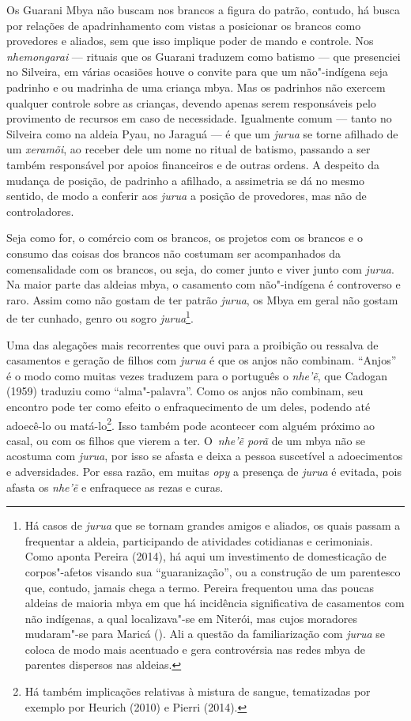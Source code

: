 Os Guarani Mbya não buscam nos brancos a figura do patrão, contudo, há
busca por relações de apadrinhamento com vistas a posicionar os brancos
como provedores e aliados, sem que isso implique poder de mando e
controle. Nos \emph{nhemongarai} --- rituais que os Guarani traduzem como
batismo --- que presenciei no Silveira, em várias ocasiões houve o
convite para que um não"-indígena seja padrinho e ou madrinha de uma
criança mbya. Mas os padrinhos não exercem qualquer controle sobre as
crianças, devendo apenas serem responsáveis pelo provimento de recursos
em caso de necessidade. Igualmente comum --- tanto no Silveira como na
aldeia Pyau, no Jaraguá --- é que um \emph{jurua} se torne afilhado de um
\emph{xeramõi}, ao receber dele um nome no ritual de batismo, passando a ser
também responsável por apoios financeiros e de outras ordens. A
despeito da mudança de posição, de padrinho a afilhado, a assimetria se
dá no mesmo sentido, de modo a conferir aos \emph{jurua} a posição de
provedores, mas não de controladores.

Seja como for, o comércio com os brancos, os projetos com os brancos e o
consumo das coisas dos brancos não costumam ser acompanhados da
comensalidade com os brancos, ou seja, do comer junto e viver junto com
\emph{jurua}. Na maior parte das aldeias mbya, o casamento com não"-indígena é
controverso e raro. Assim como não gostam de ter patrão \emph{jurua}, os Mbya
em geral não gostam de ter cunhado, genro ou sogro \emph{jurua}\footnote{Há
casos de \emph{jurua} que se tornam grandes amigos e aliados, os quais passam
a frequentar a aldeia, participando de atividades cotidianas e
cerimoniais. Como aponta Pereira (2014), há aqui um investimento de
domesticação de corpos"-afetos visando sua ``guaranização'', ou a
construção de um parentesco que, contudo, jamais chega a termo. Pereira
frequentou uma das poucas aldeias de maioria mbya em que há incidência
significativa de casamentos com não indígenas, a qual localizava"-se em
Niterói, mas cujos moradores mudaram"-se para Maricá (). Ali a questão
da familiarização com \emph{jurua} se coloca de modo mais acentuado e gera
controvérsia nas redes mbya de parentes dispersos nas aldeias.}. 

Uma das alegações mais recorrentes que ouvi para a proibição ou ressalva
de casamentos e geração de filhos com \emph{jurua} é que os anjos não
combinam. ``Anjos'' é o modo como muitas vezes traduzem para o português
o \emph{nhe’ẽ}, que Cadogan (1959) traduziu como ``alma"-palavra''. Como os
anjos não combinam, seu encontro pode ter como efeito o enfraquecimento
de um deles, podendo até adoecê-lo ou matá-lo\footnote{Há também
implicações relativas à mistura de sangue, tematizadas por exemplo por
Heurich (2010) e Pierri (2014).}. Isso também pode acontecer com alguém
próximo ao casal, ou com os filhos que vierem a ter. O~\emph{nhe’ẽ porã}
de um mbya não se acostuma com \emph{jurua}, por isso se afasta e deixa a
pessoa suscetível a adoecimentos e adversidades. Por essa razão, em
muitas \emph{opy} a presença de \emph{jurua} é evitada, pois afasta os \emph{nhe’ẽ} e
enfraquece as rezas e curas.

